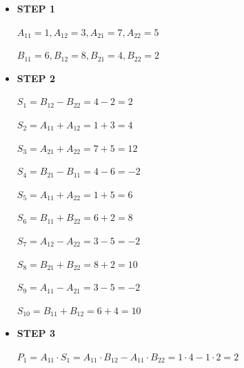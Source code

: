 \documentclass[12pt]{article}
\begin{document}
\begin{enumerate}[1.]
\begin{itemize}
\begin{itemize}
            \begin{itemize}
                \item \textbf{STEP 1}

                \bigskip

                $A_{11} = 1, A_{12} = 3, A_{21} = 7, A_{22} = 5$

                \bigskip

                $B_{11} = 6, B_{12} = 8, B_{21} = 4, B_{22} = 2$

                \bigskip
                \item \textbf{STEP 2}

                \bigskip

                $S_1 = B_{12} - B_{22} = 4 - 2 = 2$

                \bigskip

                $S_2 = A_{11} + A_{12} = 1 + 3 = 4$

                \bigskip

                $S_3 = A_{21} + A_{22} = 7 + 5 = 12$

                \bigskip

                $S_4 = B_{21} - B_{11} = 4 - 6 = -2$

                \bigskip

                $S_5 = A_{11} + A_{22} = 1 + 5 = 6$

                \bigskip

                $S_6 = B_{11} + B_{22} = 6 + 2 = 8$

                \bigskip

                $S_7 = A_{12} - A_{22} = 3 - 5 = -2$

                \bigskip

                $S_8 = B_{21} + B_{22} = 8 + 2 = 10$

                \bigskip

                $S_9 = A_{11} - A_{21} = 3 - 5 = -2$

                \bigskip

                $S_{10} = B_{11} + B_{12} = 6 + 4 = 10$

                \bigskip

                \item \textbf{STEP 3}

                \bigskip

                $P_1 = A_{11} \cdot S_1 = A_{11} \cdot B_{12} - A_{11} \cdot B_{22} = 1 \cdot 4 - 1 \cdot 2 = 2$


\end{itemize}
\end{itemize}
\end{itemize}
\end{enumerate}
\end{document}
